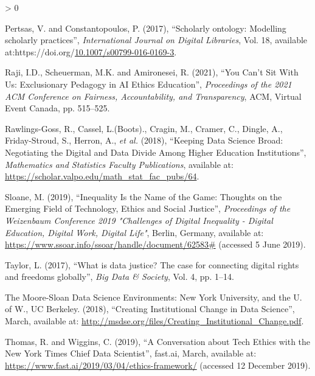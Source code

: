 \documentclass[
]{article}
\newlength{\cslhangindent}
\newenvironment{CSLReferences}[2] %
 {%
  \setlength{\parindent}{0pt}
  \ifodd #1 \everypar{\setlength{\hangindent}{\cslhangindent}}\ignorespaces\fi
  \ifnum #2 > 0
  \setlength{\parskip}{#2\baselineskip}
  \fi
 }%
 {}
\begin{document}
\begin{CSLReferences}{1}{0}
\leavevmode\hypertarget{ref-pertsas_2017}{}%
Pertsas, V. and Constantopoulos, P. (2017), {``Scholarly ontology:
Modelling scholarly practices''}, \emph{International Journal on Digital
Libraries}, Vol. 18, available
at:https://doi.org/\href{https://doi.org/10.1007/s00799-016-0169-3}{10.1007/s00799-016-0169-3}.

\leavevmode\hypertarget{ref-rajiYouCanSit2021}{}%
Raji, I.D., Scheuerman, M.K. and Amironesei, R. (2021), {``You {Can}'t
{Sit} {With} {Us}: {Exclusionary} {Pedagogy} in {AI} {Ethics}
{Education}''}, \emph{Proceedings of the 2021 {ACM} {Conference} on
{Fairness}, {Accountability}, and {Transparency}}, ACM, Virtual Event
Canada, pp. 515--525.

\leavevmode\hypertarget{ref-rawlings-gossKeepingDataScience2018}{}%
Rawlings-Goss, R., Cassel, L.(Boots)., Cragin, M., Cramer, C., Dingle,
A., Friday-Stroud, S., Herron, A., \emph{et al.} (2018), {``Keeping
{Data} {Science} {Broad}: {Negotiating} the {Digital} and {Data}
{Divide} {Among} {Higher} {Education} {Institutions}''},
\emph{Mathematics and Statistics Faculty Publications}, available at:
\url{https://scholar.valpo.edu/math_stat_fac_pubs/64}.

\leavevmode\hypertarget{ref-sloaneInequalityNameGame2019a}{}%
Sloane, M. (2019), {``Inequality {Is} the {Name} of the {Game}:
{Thoughts} on the {Emerging} {Field} of {Technology}, {Ethics} and
{Social} {Justice}''}, \emph{Proceedings of the {Weizenbaum}
{Conference} 2019 "{Challenges} of {Digital} {Inequality} - {Digital}
{Education}, {Digital} {Work}, {Digital} {Life}"}, Berlin, Germany,
available at: \url{https://www.ssoar.info/ssoar/handle/document/62583\#}
(accessed 5 June 2019).

\leavevmode\hypertarget{ref-taylorWhatDataJustice2017}{}%
Taylor, L. (2017), {``What is data justice? {The} case for connecting
digital rights and freedoms globally''}, \emph{Big Data \& Society},
Vol. 4, pp. 1--14.

\leavevmode\hypertarget{ref-themoore-sloandatascienceenvironments:newyorkuniversityucberkeleyandtheuniversityofwashingtonCreatingInstitutionalChange2018}{}%
The Moore-Sloan Data Science Environments: New York University, and the
U. of W., UC Berkeley. (2018), {``Creating {Institutional} {Change} in
{Data} {Science}''}, March, available at:
\url{http://msdse.org/files/Creating_Institutional_Change.pdf}.

\leavevmode\hypertarget{ref-thomasConversationTechEthics2019}{}%
Thomas, R. and Wiggins, C. (2019), {``A {Conversation} about {Tech}
{Ethics} with the {New} {York} {Times} {Chief} {Data} {Scientist}''},
fast.ai, March, available at:
\url{https://www.fast.ai/2019/03/04/ethics-framework/} (accessed 12
December 2019).


\end{CSLReferences}
\end{document}

